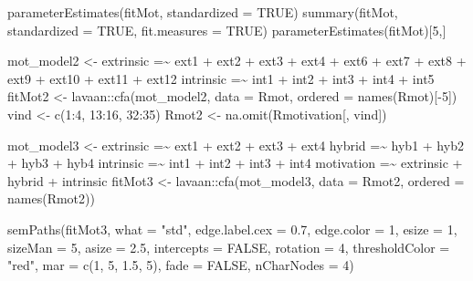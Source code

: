\documentclass[
]{book}
\newenvironment{Shaded}{\begin{snugshade}}{\end{snugshade}}
\newcommand{\AttributeTok}[1]{\textcolor[rgb]{0.77,0.63,0.00}{#1}}
\newcommand{\ConstantTok}[1]{\textcolor[rgb]{0.00,0.00,0.00}{#1}}
\newcommand{\DecValTok}[1]{\textcolor[rgb]{0.00,0.00,0.81}{#1}}
\newcommand{\FloatTok}[1]{\textcolor[rgb]{0.00,0.00,0.81}{#1}}
\newcommand{\FunctionTok}[1]{\textcolor[rgb]{0.00,0.00,0.00}{#1}}
\newcommand{\NormalTok}[1]{#1}
\newcommand{\OtherTok}[1]{\textcolor[rgb]{0.56,0.35,0.01}{#1}}
\newcommand{\SpecialCharTok}[1]{\textcolor[rgb]{0.00,0.00,0.00}{#1}}
\newcommand{\StringTok}[1]{\textcolor[rgb]{0.31,0.60,0.02}{#1}}
\begin{document}
\begin{Shaded}
\begin{Highlighting}[]
\FunctionTok{parameterEstimates}\NormalTok{(fitMot, }\AttributeTok{standardized =} \ConstantTok{TRUE}\NormalTok{)}
\FunctionTok{summary}\NormalTok{(fitMot, }\AttributeTok{standardized =} \ConstantTok{TRUE}\NormalTok{, }\AttributeTok{fit.measures =} \ConstantTok{TRUE}\NormalTok{)}
\FunctionTok{parameterEstimates}\NormalTok{(fitMot)[}\DecValTok{5}\NormalTok{,]}

\NormalTok{mot\_model2 }\OtherTok{\textless{}{-}} \StringTok{\textquotesingle{}}
\StringTok{  extrinsic  =\textasciitilde{} ext1 + ext2 + ext3 + ext4 + ext6 + ext7 + }
\StringTok{                ext8 + ext9 + ext10 + ext11 + ext12}
\StringTok{  intrinsic =\textasciitilde{}  int1 + int2 + int3 + int4 + int5\textquotesingle{}}
\NormalTok{fitMot2 }\OtherTok{\textless{}{-}}\NormalTok{ lavaan}\SpecialCharTok{::}\FunctionTok{cfa}\NormalTok{(mot\_model2, }\AttributeTok{data =}\NormalTok{ Rmot, }\AttributeTok{ordered =} \FunctionTok{names}\NormalTok{(Rmot)[}\SpecialCharTok{{-}}\DecValTok{5}\NormalTok{])}
\NormalTok{vind }\OtherTok{\textless{}{-}} \FunctionTok{c}\NormalTok{(}\DecValTok{1}\SpecialCharTok{:}\DecValTok{4}\NormalTok{, }\DecValTok{13}\SpecialCharTok{:}\DecValTok{16}\NormalTok{, }\DecValTok{32}\SpecialCharTok{:}\DecValTok{35}\NormalTok{)}
\NormalTok{Rmot2 }\OtherTok{\textless{}{-}} \FunctionTok{na.omit}\NormalTok{(Rmotivation[, vind])}

\NormalTok{mot\_model3 }\OtherTok{\textless{}{-}} \StringTok{\textquotesingle{}}
\StringTok{  extrinsic  =\textasciitilde{} ext1 + ext2 + ext3 + ext4 }
\StringTok{  hybrid =\textasciitilde{} hyb1 + hyb2 + hyb3 + hyb4              }
\StringTok{  intrinsic =\textasciitilde{}  int1 + int2 + int3 + int4 }
\StringTok{  motivation =\textasciitilde{} extrinsic + hybrid + intrinsic\textquotesingle{}}
\NormalTok{fitMot3 }\OtherTok{\textless{}{-}}\NormalTok{ lavaan}\SpecialCharTok{::}\FunctionTok{cfa}\NormalTok{(mot\_model3, }\AttributeTok{data =}\NormalTok{ Rmot2, }\AttributeTok{ordered =} \FunctionTok{names}\NormalTok{(Rmot2))}

\FunctionTok{semPaths}\NormalTok{(fitMot3, }\AttributeTok{what =} \StringTok{"std"}\NormalTok{, }\AttributeTok{edge.label.cex =} \FloatTok{0.7}\NormalTok{, }\AttributeTok{edge.color =} \DecValTok{1}\NormalTok{, }\AttributeTok{esize =} \DecValTok{1}\NormalTok{, }\AttributeTok{sizeMan =} \DecValTok{5}\NormalTok{, }\AttributeTok{asize =} \FloatTok{2.5}\NormalTok{,}
         \AttributeTok{intercepts =} \ConstantTok{FALSE}\NormalTok{, }\AttributeTok{rotation =} \DecValTok{4}\NormalTok{, }\AttributeTok{thresholdColor =} \StringTok{"red"}\NormalTok{, }\AttributeTok{mar =} \FunctionTok{c}\NormalTok{(}\DecValTok{1}\NormalTok{, }\DecValTok{5}\NormalTok{, }\FloatTok{1.5}\NormalTok{, }\DecValTok{5}\NormalTok{), }\AttributeTok{fade =} \ConstantTok{FALSE}\NormalTok{, }\AttributeTok{nCharNodes =} \DecValTok{4}\NormalTok{)}


\end{Highlighting}
\end{Shaded}
\end{document}
